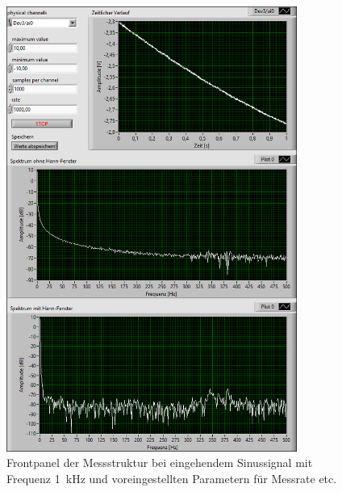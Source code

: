 \begin{figure}[H]
	\centering
	\includegraphics[width=0.85\textwidth]{pic/abtast_1kHz.png}	
	\caption{Frontpanel der Messstruktur bei eingehendem Sinussignal mit Frequenz \SI{1}{\kilo\hertz} und voreingestellten Parametern für Messrate etc.}
	\label{fig:abtast_1kHz}
\end{figure}

